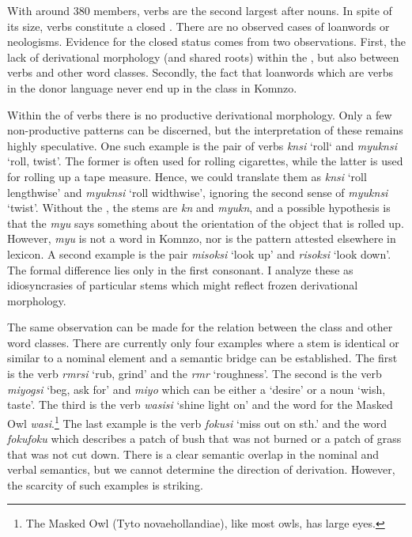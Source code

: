 With around 380 members, verbs are the second largest  after nouns. In spite of its size, verbs constitute a closed . There are no observed cases of loanwords or neologisms. Evidence for the closed status comes from two observations. First, the lack of derivational morphology (and shared roots) within the , but also between verbs and other word classes. Secondly, the fact that loanwords which are verbs in the donor language never end up in the  class in Komnzo.%

Within the  of verbs there is no productive derivational morphology. Only a few non-productive patterns can be discerned, but the interpretation of these remains highly speculative. One such example is the pair of verbs \emph{knsi} `roll` and \emph{myuknsi} `roll, twist'. The former is often used for rolling cigarettes, while the latter is used for rolling up a tape measure. Hence, we could translate them as \emph{knsi} `roll lengthwise' and \emph{myuknsi} `roll widthwise', ignoring the second sense of \emph{myuknsi} `twist'. Without the , the stems are \emph{kn} and \emph{myukn}, and a possible hypothesis is that the \emph{myu} says something about the orientation of the object that is rolled up. However, \emph{myu} is not a word in Komnzo, nor is the pattern attested elsewhere in  lexicon. A second example is the pair \emph{misoksi} `look up' and \emph{risoksi} `look down'. The formal difference lies only in the first consonant. I analyze these as idiosyncrasies of particular stems which might reflect frozen derivational morphology.%

The same observation can be made for the relation between the  class and other word classes. There are currently only four examples where a  stem is identical or similar to a nominal element and a semantic bridge can be established. The first is the verb \emph{rmrsi} `rub, grind' and the  \emph{rmr} `roughness'. The second is the verb \emph{miyogsi} `beg, ask for' and \emph{miyo} which can be either a  `desire' or a noun `wish, taste'. The third is the verb \emph{wasisi} `shine light on' and the word for the Masked Owl \emph{wasi}.\footnote{The Masked Owl (Tyto novaehollandiae), like most owls, has large eyes.} The last example is the verb \emph{fokusi} `miss out on sth.' and the word \emph{fokufoku} which describes a patch of bush that was not burned or a patch of grass that was not cut down. There is a clear semantic overlap in the nominal and verbal semantics, but we cannot determine the direction of derivation. However, the scarcity of such examples is striking.%

